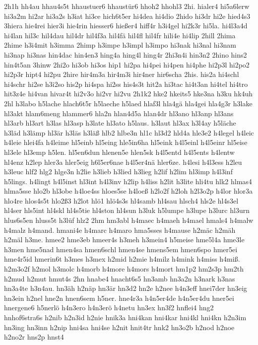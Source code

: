 {2h1h
hh4au
hhau4s5t
hhaustuer6
hhaustür6
hhoh2
hhohl3
2hi.
hialer4
hi5a6lerw
hi3a2m
hi2ar
hi3a2s
h3iat
hi3ce
hich6t5er
hi4dea
hi4dio
2hido
hi3dr
hi2e
hied4s3
3hiera
hie4rei
hier3i
hie4rin
hiesser6
hießer4
hiff4r
h3i4gel
hi2k3r
hi5la.
hi4l3a4d
hi4lan
hil3c
hil4dau
hil4dr
hil4f3a
hil4fä
hil4fl
hil4fr
hili4e
hi4lip
2hill
2hima
2hime
h3i4mit
h3imma
2himp
h3impe
h3impl
h3impo
hi3nak
hi3nal
hi3nam
hi3nap
hi3nas
hin4dac
hin4en3
hing4a
hing4l
hing4r
2hi3n4i
hin3n2
2hino
hins2
hin4t5an
3hinw
2hi2o
hi3ob
hi3os
hip1
hi2pa
hi4pei
hi4pen
hi4phe
hi2p3l
hi2po2
hi2p3r
hipt4
hi2pu
2hire
hir4m3a
hir4m3i
hir4ner
hir6scha
2his.
his2a
hi4schl
hi4schr
hi2se
h3i2so
his2p
hi4spa
hi2ss
his4s3t
hit2a
hi3tac
hi4t3an
hi4tel
hi4tro
hit3z4e
hi4van
hivar4t
hi2v3o
hi2vr
hi2vu
2h1k2
hke2
hkeits5
hke3na
h3ku
hk4uh
2hl
h3labo
h5lache
hlach6t5r
h5laeche
h5laed
hlaf3l
hla4gä
hla4gei
hla4g3r
h3lake
hl3akt
hlam6meng
hlammer6
hla2n
hlan4d5a
hlan4dr
hl3ano
hl3anp
hl3ans
hl3arb
hl3art
h3las
hl3asp
h3late
hl3ato
h5laus.
h3laut
hl3ax
h3l4ay
h5läche
h3läd
h3lämp
hl3är
h3läs
h3läß
hlb2
hlbe3n
hl1c
hl3d2
hld4a
hle3e2
h4legel
h4leic
h4leie
hlei4fa
h4leime
hl5einb
hl5eing
hle5in6ha
hl5eink
h4l5einl
h4l5einr
hl5eise
hl3ele
hl3emp
h5len.
hl5en6dun
hlenen5e
hlen5sk
h4l5entd
h4l5ents
h4lentw
hl4enz
h2lep
hler3a
hler5eig
h6l5er6nae
h4l5er4nä
hler6ze.
h4lesi
h4l3ess
h2leu
h3leuc
hlf2
hlg2
hlge3n
h2lie
h3lieb
h3lied
h3lieg
h2lif
h2lim
hl3imp
h4l3inf
h5lings.
h4lingt
h4l5inst
hl3int
h4l3inv
h2lip
h4liss
h2lit
h3lite
hli4tu
hlk2
hlmas4
hlma5sse
hlo2b
hl3obe
h4loe4ss
hloes5se
h4loeß
h2lo2f
h2loh
h2l3o2p
h4lor
hlor3a
hlo4re
hlos4s5t
hlo2ß3
h2lot
hlö1
hlö4s3s
hl4samb
hl4sau
hlsch4
hls2e
hl4s3el
hl4ser
hls5int
hl4skl
hl4s5tie
hl4ston
hl4sun
h3luk
h5lumpe
h3lupe
h3lurc
hl3urn
hlus6s5en
hluss5t
h3lüf
hlz2
2hm
hm3abl
h4maec
h4maeh
h4mael
hmals4
h4malw
h4malz
h4mand.
hmani4e
h4marc
h4maro
hma5sses
h4mause
h2mäc
h2mäh
h2mäl
h3me.
hmee2
hme3eb
hmeer4s
h3meh
h3mein4
h5meise
hme5l4a
hme3le
h3men
hme5nad
hmen4sa
hmen6schl
hmen4se
hmens5em
hmen6spo
hmer5ei
hme4r5id
hmerin6t
h3mes
h3mex
h2mid
h2mie
h4milz
h4mink
h4miss
h4miß.
h2m3o2f
h2mol
h3molc
h4morb
h4more
h4mors
h4mort
hm1p2
hm2s3p
hm2th
h2mud
h2mut
hmut4s
2hn
hnabe4
hnacht6s5
hn3amb
hn3a2n
h3nark
h3nas
hn3a4te
h3n4au.
hn3äh
h2näp
hn3är
hn3d2
hn2e
h2nee
h4n3eff
hnei7der
hn3eig
hn3ein
h2nel
hne2n
hnen6sem
h5ner.
hne4r3a
h4n5er4de
h4n5er4du
hner5ei
hnergene6
h5nerlö
h4n3ero
h4n3erö
h4netu
hn3ex
hn3f2
hnflei4
hng2
hnhof6stra6s
h2nib
h2n3id
h2nie
hnik3a
hni4kan
hni4kar
hni4kl
hni4kn
h2n3im
hn3ing
hn3inn
h2nip
hni4sa
hni4se
h2nit
hnit4tr
hnk2
hn3o2b
h2nod
h2noe
h2no2r
hns2p
hnst4
}
